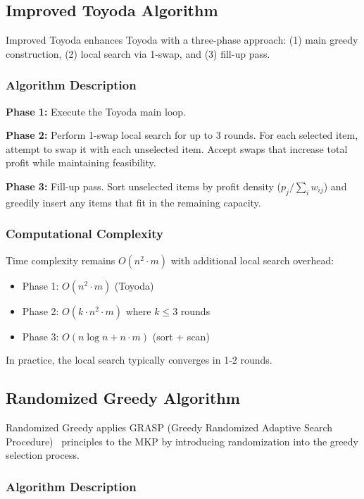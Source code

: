 \documentclass[12pt,a4paper]{article}
\begin{document}
\subsection{Improved Toyoda Algorithm}

Improved Toyoda enhances Toyoda with a three-phase approach: (1) main greedy construction, (2) local search via 1-swap, and (3) fill-up pass.

\subsubsection{Algorithm Description}

\textbf{Phase 1:} Execute the Toyoda main loop.

\textbf{Phase 2:} Perform 1-swap local search for up to 3 rounds. For each selected item, attempt to swap it with each unselected item. Accept swaps that increase total profit while maintaining feasibility.

\textbf{Phase 3:} Fill-up pass. Sort unselected items by profit density ($p_j / \sum_i w_{ij}$) and greedily insert any items that fit in the remaining capacity.

\subsubsection{Computational Complexity}

Time complexity remains $O(n^2 \cdot m)$ with additional local search overhead:
\begin{itemize}
    \item Phase 1: $O(n^2 \cdot m)$ (Toyoda)
    \item Phase 2: $O(k \cdot n^2 \cdot m)$ where $k \leq 3$ rounds
    \item Phase 3: $O(n \log n + n \cdot m)$ (sort + scan)
\end{itemize}

In practice, the local search typically converges in 1-2 rounds.

\subsection{Randomized Greedy Algorithm}

Randomized Greedy applies GRASP (Greedy Randomized Adaptive Search Procedure)~\cite{feo1995greedy} principles to the MKP by introducing randomization into the greedy selection process.

\subsubsection{Algorithm Description}
\end{document}

